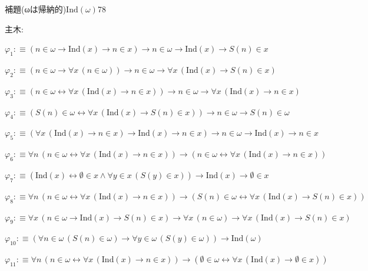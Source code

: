 \begin{fullproof}{補題(ωは帰納的)}{$\mathrm{Ind}(\omega)$}{78}
\begin{ptree}
\noLine
{}
\end{ptree}
\noindent 主木:
\begin{ptree}
\noLine
{}
\noLine
{}
\end{ptree}
\begin{abbrevlist}
\item $\varphi_{1} :\equiv (n \in \omega \to \mathrm{Ind}(x) \to n \in x) \to n \in \omega \to \mathrm{Ind}(x) \to S(n) \in x$
\item $\varphi_{2} :\equiv (n \in \omega \to \forall x\,(n \in \omega)) \to n \in \omega \to \forall x\,(\mathrm{Ind}(x) \to S(n) \in x)$
\item $\varphi_{3} :\equiv (n \in \omega \leftrightarrow \forall x\,(\mathrm{Ind}(x) \to n \in x)) \to n \in \omega \to \forall x\,(\mathrm{Ind}(x) \to n \in x)$
\item $\varphi_{4} :\equiv (S(n) \in \omega \leftrightarrow \forall x\,(\mathrm{Ind}(x) \to S(n) \in x)) \to n \in \omega \to S(n) \in \omega$
\item $\varphi_{5} :\equiv (\forall x\,(\mathrm{Ind}(x) \to n \in x) \to \mathrm{Ind}(x) \to n \in x) \to n \in \omega \to \mathrm{Ind}(x) \to n \in x$
\item $\varphi_{6} :\equiv \forall n\,(n \in \omega \leftrightarrow \forall x\,(\mathrm{Ind}(x) \to n \in x)) \to (n \in \omega \leftrightarrow \forall x\,(\mathrm{Ind}(x) \to n \in x))$
\item $\varphi_{7} :\equiv (\mathrm{Ind}(x) \leftrightarrow \emptyset \in x \land \forall y \in x\,(S(y) \in x)) \to \mathrm{Ind}(x) \to \emptyset \in x$
\item $\varphi_{8} :\equiv \forall n\,(n \in \omega \leftrightarrow \forall x\,(\mathrm{Ind}(x) \to n \in x)) \to (S(n) \in \omega \leftrightarrow \forall x\,(\mathrm{Ind}(x) \to S(n) \in x))$
\item $\varphi_{9} :\equiv \forall x\,(n \in \omega \to \mathrm{Ind}(x) \to S(n) \in x) \to \forall x\,(n \in \omega) \to \forall x\,(\mathrm{Ind}(x) \to S(n) \in x)$
\item $\varphi_{10} :\equiv (\forall n \in \omega\,(S(n) \in \omega) \to \forall y \in \omega\,(S(y) \in \omega)) \to \mathrm{Ind}(\omega)$
\item $\varphi_{11} :\equiv \forall n\,(n \in \omega \leftrightarrow \forall x\,(\mathrm{Ind}(x) \to n \in x)) \to (\emptyset \in \omega \leftrightarrow \forall x\,(\mathrm{Ind}(x) \to \emptyset \in x))$

\end{abbrevlist}
\end{fullproof}
